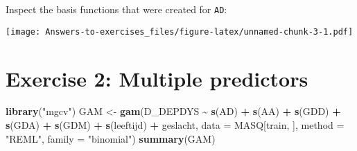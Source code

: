 \documentclass[
]{article}
\newenvironment{Shaded}{\begin{snugshade}}{\end{snugshade}}
\newcommand{\AttributeTok}[1]{\textcolor[rgb]{0.13,0.29,0.53}{#1}}
\newcommand{\FunctionTok}[1]{\textcolor[rgb]{0.13,0.29,0.53}{\textbf{#1}}}
\newcommand{\NormalTok}[1]{#1}
\newcommand{\OtherTok}[1]{\textcolor[rgb]{0.56,0.35,0.01}{#1}}
\newcommand{\SpecialCharTok}[1]{\textcolor[rgb]{0.81,0.36,0.00}{\textbf{#1}}}
\newcommand{\StringTok}[1]{\textcolor[rgb]{0.31,0.60,0.02}{#1}}
\begin{document}
Inspect the basis functions that were created for \texttt{AD}:

\begin{Shaded}
\end{Shaded}

\texttt{[image: Answers-to-exercises\_files/figure-latex/unnamed-chunk-3-1.pdf]}

\hypertarget{exercise-2-multiple-predictors}{%
\section{Exercise 2: Multiple
predictors}\label{exercise-2-multiple-predictors}}

\begin{Shaded}
\begin{Highlighting}[]
\FunctionTok{library}\NormalTok{(}\StringTok{"mgcv"}\NormalTok{)}
\NormalTok{GAM }\OtherTok{\textless{}{-}} \FunctionTok{gam}\NormalTok{(D\_DEPDYS }\SpecialCharTok{\textasciitilde{}} \FunctionTok{s}\NormalTok{(AD) }\SpecialCharTok{+} \FunctionTok{s}\NormalTok{(AA) }\SpecialCharTok{+} \FunctionTok{s}\NormalTok{(GDD) }\SpecialCharTok{+} \FunctionTok{s}\NormalTok{(GDA) }\SpecialCharTok{+} \FunctionTok{s}\NormalTok{(GDM) }\SpecialCharTok{+} \FunctionTok{s}\NormalTok{(leeftijd) }\SpecialCharTok{+}\NormalTok{ geslacht, }
           \AttributeTok{data =}\NormalTok{ MASQ[train, ], }\AttributeTok{method =} \StringTok{"REML"}\NormalTok{, }\AttributeTok{family =} \StringTok{"binomial"}\NormalTok{)}
\FunctionTok{summary}\NormalTok{(GAM)}
\end{Highlighting}
\end{Shaded}
\end{document}

